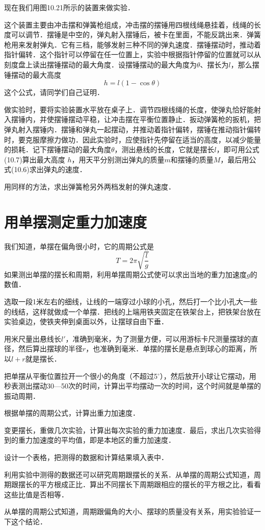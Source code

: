 现在我们用图10.21所示的装置来做实验．

这个装置主要由冲击摆和弹簧枪组成，冲击摆的摆锤用四根线绳悬挂着，线绳的长度可以调节．摆锤是中空的，弹丸射入摆锤后，被卡在里面，不能反跳出来．弹簧枪用来发射弹丸．它有三档，能够发射三种不同的弹丸速度．摆锤摆动时，推动着指针偏转．这个指针可以停留在任一位置上，实验中根据指针停留的位置就可以从刻度盘上读出摆锤摆动的最大角度．设摆锤摆动的最大角度为$\theta$、摆长为$l$，那么摆锤摆动的最大高度
\begin{equation}
    h=l(1-\cos\theta)
\end{equation}
这个公式，请同学们自己证明．

做实验时，要将实验装置水平放在桌子上．调节四根线绳的长度，使弹丸恰好能射入摆锤内，并使摆锤摆动平稳，让冲击摆在平衡位置静止．扳动弹簧枪的扳机，把弹丸射入摆锤内．摆锤和弹丸一起摆动，并推动着指针偏转，摆锤在推动指针偏转时，要克服摩擦力做功．因此实验时，应使指针先停留在适当的高度，以减少能量的损耗．记下摆锤摆动的最大角度$\theta$，测出悬线的长度，它就是摆长$l$，即可用公式(10.7)算出最大高度 $h$，用天平分别测出弹丸的质量$m$和摆锤的质量$M$，最后用公式(10.6)求出弹丸的速度．

用同样的方法，求出弹簧枪另外两档发射的弹丸速度．
\newpage
\section{用单摆测定重力加速度}
我们知道，单摆在偏角很小时，它的周期公式是
\[T=2\pi\sqrt{\frac{l}{g}}  \]
如果测出单摆的摆长和周期，利用单摆周期公式使可以求出当地的重力加速度$g$的数值．

选取一段1米左右的细线，让线的一端穿过小球的小孔，然后打一个比小孔大一些的线结，这样就做成一个单摆．把线的上端用铁夹固定在铁架台上，把铁架台放在实验桌边，使铁夹伸到桌面以外，让摆球自由下垂．

用米尺量出悬线长$l'$，准确到毫米，为了测量方便，可以用游标卡尺测量摆球的直径，然后算出摆球的半径$r$，也准确到毫米．单摆的摆长是悬点到球心的距离，所以$l+r$就是摆长．

把单摆从平衡位置拉开一个很小的角度（不超过5$^\circ$），然后放开小球让它摆动，用秒表测出摆动30—50次的时间，计算出平均摆动一次的时间，这个时间就是单摆的振动周期．

根据单摆的周期公式，计算出重力加速度．

变更摆长，重做几次实验，计算出每次实验的重力加速度．最后，求出几次实验得到的重力加速度的平均值，即是本地区的重力加速度．

设计一个表格，把测得的数据和计算结果填入表中．

利用实验中测得的数据还可以研究周期跟摆长的关系．从单摆的周期公式知道，周期跟摆长的平方根成正比．算出不同摆长下周期跟相应的摆长的平方根之比，看看这些比值是否相等．

从单摆的周期公式知道，周期跟偏角的大小、摆球的质量没有关系，用实验验证一下这个结论．


